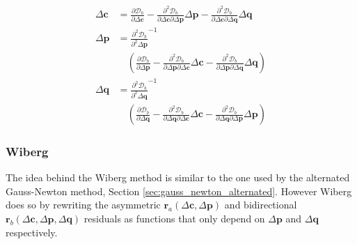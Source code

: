 \begin{equation}
    \begin{aligned}
        \Delta \mathbf{c} & =  \frac{\partial \mathcal{D}_b}{\partial \Delta \mathbf{c}} - \frac{\partial^2 \mathcal{D}_b}{\partial \Delta \mathbf{c} \partial \Delta \mathbf{p}} \Delta \mathbf{p} - \frac{\partial^2 \mathcal{D}_b}{\partial \Delta \mathbf{c} \partial \Delta \mathbf{q}} \Delta \mathbf{q}
        \\
        \Delta \mathbf{p} & = \frac{\partial^2 \mathcal{D}_b}{\partial^2 \Delta \mathbf{p}}^{-1} 
        \\
        & \quad \left( \frac{\partial \mathcal{D}_b}{\partial \Delta \mathbf{p}} - \frac{\partial^2 \mathcal{D}_b}{\partial \Delta \mathbf{p} \partial \Delta \mathbf{c}} \Delta \mathbf{c} - \frac{\partial^2 \mathcal{D}_b}{\partial \Delta \mathbf{p} \partial \Delta \mathbf{q}} \Delta \mathbf{q} \right)
        \\
        \Delta \mathbf{q} & = \frac{\partial^2 \mathcal{D}_b}{\partial^2 \Delta \mathbf{q}}^{-1} 
        \\
        & \quad \left( \frac{\partial \mathcal{D}_b}{\partial \Delta \mathbf{q}} - \frac{\partial^2 \mathcal{D}_b}{\partial \Delta \mathbf{q} \partial \Delta \mathbf{c}} \Delta \mathbf{c} - \frac{\partial^2 \mathcal{D}_b}{\partial \Delta \mathbf{q} \partial \Delta \mathbf{p}} \Delta \mathbf{p} \right)
        \label{eq:bidirectional_newton_alternated_solution2}
    \end{aligned}
\end{equation}

\subsubsection{Wiberg}
\label{sec:wiberg}

The idea behind the Wiberg method is similar to the one used by the alternated Gauss-Newton method, Section \ref{sec:gauss_newton_alternated}. However Wiberg does so by rewriting the asymmetric $\mathbf{r}_a(\Delta\mathbf{c}, \Delta\mathbf{p})$ and bidirectional $\mathbf{r}_b(\Delta\mathbf{c}, \Delta\mathbf{p},\Delta\mathbf{q})$ residuals as functions that only depend on $\Delta\mathbf{p}$ and $\Delta\mathbf{q}$ respectively.

